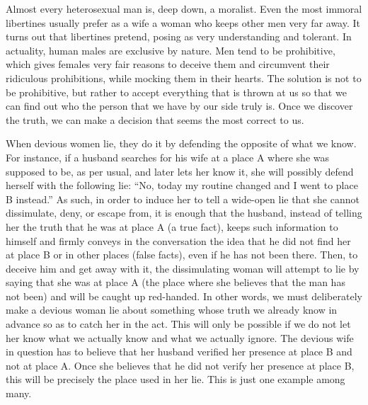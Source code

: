\par Almost every heterosexual man is, deep down, a moralist. Even the most immoral libertines usually prefer as a wife a woman who keeps other men very far away. It turns out that libertines pretend, posing as very understanding and tolerant. In actuality, human males are exclusive by nature. Men tend to be prohibitive, which gives females very fair reasons to deceive them and circumvent their ridiculous prohibitions, while mocking them in their hearts. The solution is not to be prohibitive, but rather to accept everything that is thrown at us so that we can find out who the person that we have by our side truly is. Once we discover the truth, we can make a decision that seems the most correct to us.

\par When devious women lie, they do it by defending the opposite of what we know. For instance, if a husband searches for his wife at a place A where she was supposed to be, as per usual, and later lets her know it, she will possibly defend herself with the following lie: \enquote{No, today my routine changed and I went to place B instead.} As such, in order to induce her to tell a wide-open lie that she cannot dissimulate, deny, or escape from, it is enough that the husband, instead of telling her the truth that he was at place A (a true fact), keeps such information to himself and firmly conveys in the conversation the idea that he did not find her at place B or in other places (false facts), even if he has not been there. Then, to deceive him and get away with it, the dissimulating woman will attempt to lie by saying that she was at place A (the place where she believes that the man has not been) and will be caught up red-handed. In other words, we must deliberately make a devious woman lie about something whose truth we already know in advance so as to catch her in the act. This will only be possible if we do not let her know what we actually know and what we actually ignore. The devious wife in question has to believe that her husband verified her presence at place B and not at place A. Once she believes that he did not verify her presence at place B, this will be precisely the place used in her lie. This is just one example among many.

